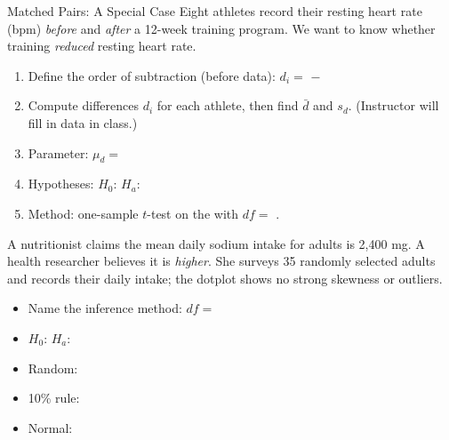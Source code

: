 \documentclass[10pt]{article}
\begin{document}
\begin{notesbox}{Matched Pairs: A Special Case}
Eight athletes record their resting heart rate (bpm) \emph{before} and \emph{after} a
12-week training program. We want to know whether training \emph{reduced} resting heart rate.

\begin{enumerate}
  \item Define the order of subtraction (before data): \quad $d_i = $ \blank{4cm} $-$ \blank{4cm}

  \item Compute differences $d_i$ for each athlete, then find $\bar d$ and $s_d$.
        (Instructor will fill in data in class.)

  \item Parameter: $\mu_d = $ \blank{7cm}

  \item Hypotheses: $H_0$: \blank{3.5cm} \quad $H_a$: \blank{3.5cm}

  \item Method: one-sample $t$-test on the \blank{8cm} with $df = $ \blank{1.5cm}.
\end{enumerate}
\end{notesbox}

\begin{practicebox}
A nutritionist claims the mean daily sodium intake for adults is 2,400 mg. A health researcher
believes it is \emph{higher}. She surveys 35 randomly selected adults and records their daily
intake; the dotplot shows no strong skewness or outliers.

\begin{itemize}
  \item Name the inference method: \blank{5cm} \quad $df = $ \blank{1.5cm}
  \item $H_0$: \blank{4cm} \quad $H_a$: \blank{4cm}
  \item Random: \blank{6cm}
  \item 10\% rule: \blank{6cm}
  \item Normal: \blank{6cm}
\end{itemize}
\end{practicebox}
\end{document}
